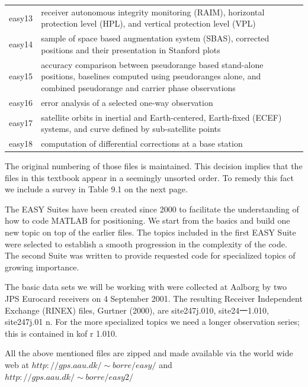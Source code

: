 \begin{table}
\begin{tabularx}{\textwidth}{cXc}
		\rule[-2ex]{0pt}{5.5ex}  easy13 & receiver autonomous integrity monitoring (RAIM), horizontal protection level (HPL), and vertical protection level (VPL) & \pageref{subsec:easy13}   \\ 
		\rule[-2ex]{0pt}{5.5ex}  easy14 & sample of space based augmentation system (SBAS), corrected positions and their presentation in Stanford plots & \pageref{subsec:easy14}   \\ 
		\rule[-2ex]{0pt}{5.5ex}  easy15 & accuracy comparison between pseudorange based stand-alone positions, baselines computed using pseudoranges alone, and combined pseudorange and carrier phase observations & \pageref{subsec:easy15}   \\ 
		\rule[-2ex]{0pt}{5.5ex}  easy16 & error analysis of a selected one-way observation 							& \pageref{subsec:easy16}   \\ 
		\rule[-2ex]{0pt}{5.5ex}  easy17 & satellite orbits in inertial and Earth-centered, Earth-fixed (ECEF) systems, and curve defined by sub-satellite points & \pageref{subsec:easy17}   \\ 
		\rule[-2ex]{0pt}{5.5ex}  easy18 & computation of differential corrections at a base station							 & \pageref{subsec:easy18}   \\ 
		\hline 
	\end{tabularx} 
\end{table}	
The original numbering of those files is maintained. This decision implies that the files in this textbook appear in a seemingly unsorted order. To remedy this fact we include a survey in Table 9.1 on the next page.

The EASY Suites have been created since 2000 to facilitate the understanding of how to code MATLAB for positioning. We start from the basics and build one new topic on top of the earlier files. The topics included in the first EASY Suite were selected to establish a smooth progression in the complexity of the code. The second Suite was written to provide requested code for specialized topics of growing importance. 

The basic data sets we will be working with were collected at Aalborg by two JPS Eurocard receivers on 4 September 2001. The resulting Receiver Independent Exchange (RINEX) files, Gurtner (2000), are site247j.010, site24一1.010, site247j.01 n. For the more specialized topics we need a longer observation series; this is contained in kof r 1.010. 

All the above mentioned files are zipped and made available via the world wide web at $http://gps.aau.dk/\sim borre/easy/$ and $http://gps.aau.dk/\sim borre/easy2/$

